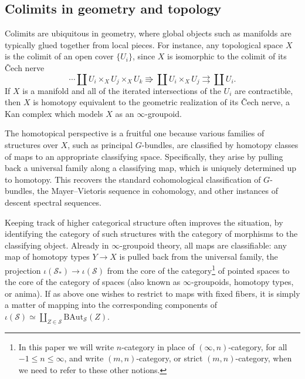 \documentclass[10pt,oneside]{article}
\numberwithin{equation}{section} %
\numberwithin{figure}{section} %
\theoremstyle{plain}
\theoremstyle{definition}
\newcommand{\mS}{{\mathcal S}}
\begin{document}
\subsection{Colimits in geometry and topology}
Colimits are ubiquitous in geometry, where global objects such as manifolds are typically glued together from local pieces.
For instance, any topological space $X$ is the colimit of an open cover $\{U_i\}$, since $X$ is isomorphic to the colimit of its \v{C}ech nerve
\[
  \cdots \coprod U_{i}\times_X U_j\times_X U_k \Rrightarrow \coprod U_i\times_X U_j \rightrightarrows \coprod U_i.
\]
If $X$ is a manifold and all of the iterated intersections of the $U_i$ are contractible, then $X$ is homotopy equivalent to the geometric realization of its \v{C}ech nerve, a Kan complex which models $X$ as an $\infty$-groupoid.

The homotopical perspective is a fruitful one because various families of structures over $X$, such as principal $G$-bundles, are classified by homotopy classes of maps to an appropriate classifying space.
Specifically, they arise by pulling back a universal family along a classifying map, which is uniquely determined up to homotopy.
This recovers the standard cohomological classification of $G$-bundles, the Mayer--Vietoris sequence in cohomology, and other instances of descent spectral sequences.






Keeping track of higher categorical structure often improves the situation, by identifying the category of such structures with the category of morphisms to the classifying object.
Already in $\infty$-groupoid theory, all maps are classifiable: any map of homotopy types $Y\to X$ is pulled back from the universal family, the projection $\iota(\mS_*)\to\iota(\mS)$ from the core of the category\footnote{In this paper we will write $n$-category in place of $(\infty,n)$-category, for all $-1\leq n\leq\infty$, and write $(m,n)$-category, or strict $(m,n)$-category, when we need to refer to these other notions.} of pointed spaces to the core of the category of spaces (also known as $\infty$-groupoids, homotopy types, or anima).
If as above one wishes to restrict to maps with fixed fibers, it is simply a matter of mapping into the corresponding components of $\iota(\mS)\simeq\coprod_{Z\in\mS} \mathrm{BAut}_{\mS}(Z)$.
\end{document}
